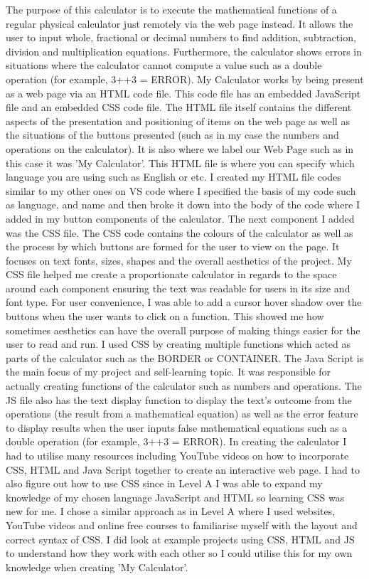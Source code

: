 \documentclass[a4paper, 11pt]{report}
\begin{document}
The purpose of this calculator is to execute the mathematical functions of a regular physical calculator just remotely via the web page instead. It allows the user to input whole, fractional or decimal numbers to find addition, subtraction, division and multiplication equations. Furthermore, the calculator shows errors in situations where the calculator cannot compute a value such as a double operation (for example, 3++3 = ERROR). 
My Calculator works by being present as a web page via an HTML code file. This code file has an embedded JavaScript file and an embedded CSS code file. The HTML file itself contains the different aspects of the presentation and positioning of items on the web page as well as the situations of the buttons presented (such as in my case the numbers and operations on the calculator). It is also where we label our Web Page such as in this case it was 'My Calculator'. This HTML file is where you can specify which language you are using such as English or etc. I created my HTML file codes similar to my other ones on VS code where I specified the basis of my code such as language, and name and then broke it down into the body of the code where I added in my button components of the calculator. The next component I added was the CSS file. The CSS code contains the colours of the calculator as well as the process by which buttons are formed for the user to view on the page. It focuses on text fonts, sizes, shapes and the overall aesthetics of the project. My CSS file helped me create a proportionate calculator in regards to the space around each component ensuring the text was readable for users in its size and font type. For user convenience,  I was able to add a cursor hover shadow over the buttons when the user wants to click on a function. This showed me how sometimes aesthetics can have the overall purpose of making things easier for the user to read and run. I used CSS by creating multiple functions which acted as parts of the calculator such as the BORDER or CONTAINER. The Java Script is the main focus of my project and self-learning topic. It was responsible for actually creating functions of the calculator such as numbers and operations. The JS file also has the text display function to display the text's outcome from the operations (the result from a mathematical equation) as well as the error feature to display results when the user inputs false mathematical equations such as a double operation (for example, 3++3 = ERROR). In creating the calculator I had to utilise many resources including YouTube videos on how to incorporate CSS, HTML and Java Script together to create an interactive web page. I had to also figure out how to use CSS since in Level A I was able to expand my knowledge of my chosen language JavaScript and HTML so learning CSS was new for me. I chose a similar approach as in Level A where I used websites, YouTube videos and online free courses to familiarise myself with the layout and correct syntax of CSS. I did look at example projects using CSS, HTML and JS to understand how they work with each other so I could utilise this for my own knowledge when creating 'My Calculator'.                           
\cite{LevelB1}
\cite{LevelB2}
\end{document}
